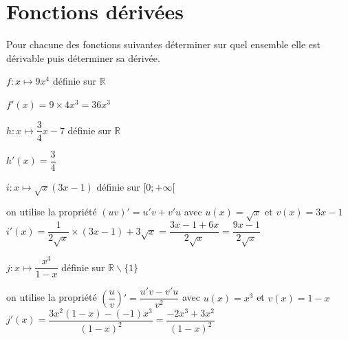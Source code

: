 \documentclass[11pt,a4paper]{article}  %
\begin{document}

\section*{Fonctions dérivées}

\exercice{}

Pour chacune des fonctions suivantes déterminer sur quel ensemble elle est dérivable puis déterminer sa dérivée.
\begin{enumMet}
	\item $f: x \mapsto 9 x^4$ définie sur $\mathbb{R}$
	\begin{corrBox}
		$f'(x)=9\times4x^3=36x^3$
	\end{corrBox}
	\item $h: x \mapsto \dfrac{3}{4} x-7$ définie sur $\mathbb{R}$
	\begin{corrBox}
		$h'(x)=\dfrac{3}{4}$
	\end{corrBox}
	\item  $i: x \mapsto \sqrt{x}(3 x-1)$ définie sur $[0 ;+\infty[$
	\begin{corrBox}
		on utilise la propriété $(uv)'=u'v+v'u$ avec $u(x)=\sqrt{x}$ et $v(x)=3x-1$\\
		$i'(x)=\dfrac{1}{2\sqrt{x}}\times(3x-1)+3\sqrt{x}=\dfrac{3x-1+6x}{2\sqrt{x}}=\dfrac{9x-1}{2\sqrt{x}}$
	\end{corrBox}
	\item $j: x \mapsto \dfrac{x^3}{1-x}$ définie sur $\mathbb{R} \backslash\{1\}$
	\begin{corrBox}
		on utilise la propriété $(\dfrac{u}{v})'=\dfrac{u'v-v'u}{v^2}$ avec $u(x)=x^3$ et $v(x)=1-x$\\
		$j'(x)=\dfrac{3x^2(1-x)-(-1)x^3}{(1-x)^2}=\dfrac{-2x^3+3x^2}{(1-x)^2}$
	\end{corrBox}
\end{enumMet}

\exercice{}
\end{document}
